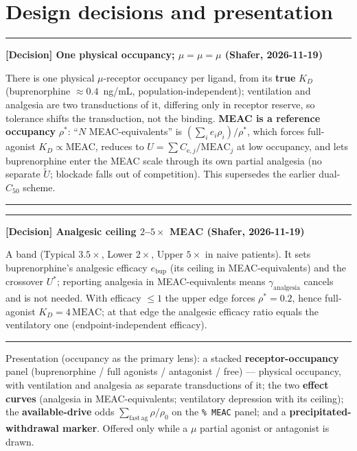 \documentclass[11pt]{article}
\newenvironment{decision}[1]
  {\par\vspace{0.3em}\noindent\textcolor{deccol}{\rule{\linewidth}{0.4pt}}\par
   \noindent\textbf{\textcolor{deccol}{[Decision] #1}}\par\nopagebreak\vspace{0.2em}}
  {\par\noindent\textcolor{deccol}{\rule{\linewidth}{0.4pt}}\par\vspace{0.3em}}
\newcommand{\Cesub}[1]{C_{\mathrm{e},#1}}
\newcommand{\rhoz}{\rho_0}
\begin{document}
\section{Design decisions and presentation}

\begin{decision}{One physical occupancy; $\mu=\mu=\mu$ (Shafer, 2026-11-19)}
There is one physical $\mu$-receptor occupancy per ligand, from its \textbf{true}
$K_D$ (buprenorphine $\approx0.4$~ng/mL, population-independent); ventilation and
analgesia are two transductions of it, differing only in receptor reserve, so
tolerance shifts the transduction, not the binding. \textbf{MEAC is a reference
occupancy} $\rho^*$: ``$N$ MEAC-equivalents'' is $(\sum_i e_i\rho_i)/\rho^*$, which
forces full-agonist $K_D\propto\mathrm{MEAC}$, reduces to $U=\sum\Cesub{j}/\mathrm{MEAC}_j$
at low occupancy, and lets buprenorphine enter the MEAC scale through its own partial
analgesia (no separate $\tilde U$; blockade falls out of competition). This supersedes
the earlier dual-$C_{50}$ scheme.
\end{decision}

\begin{decision}{Analgesic ceiling $2$--$5\times$ MEAC (Shafer, 2026-11-19)}
A band (Typical $3.5\times$, Lower $2\times$, Upper $5\times$ in naive patients). It
sets buprenorphine's analgesic efficacy $e_{\mathrm{bup}}$ (its ceiling in
MEAC-equivalents) and the crossover $U^\ast$; reporting analgesia in MEAC-equivalents
means $\gamma_{\mathrm{analgesia}}$ cancels and is not needed. With efficacy $\le1$ the
upper edge forces $\rho^*=0.2$, hence full-agonist $K_D=4\,\mathrm{MEAC}$; at that edge
the analgesic efficacy ratio equals the ventilatory one (endpoint-independent efficacy).
\end{decision}

Presentation (occupancy as the primary lens): a stacked \textbf{receptor-occupancy}
panel (buprenorphine / full agonists / antagonist / free) --- physical occupancy, with
ventilation and analgesia as separate transductions of it; the two \textbf{effect
curves} (analgesia in MEAC-equivalents; ventilatory depression with its ceiling); the
\textbf{available-drive} odds $\sum_{\mathrm{fast\,ag}}\rho/\rhoz$ on the \texttt{\% MEAC}
panel; and a \textbf{precipitated-withdrawal marker}. Offered only while a $\mu$ partial
agonist or antagonist is drawn.

\end{document}
